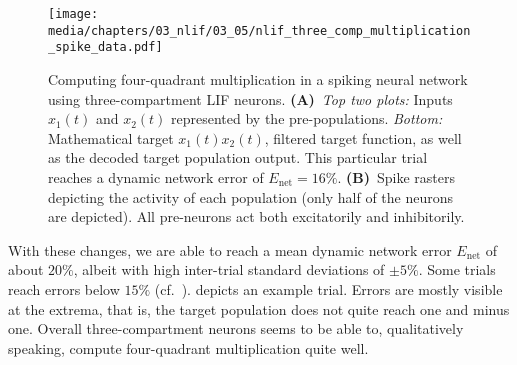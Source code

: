 \begin{figure}
	\centering
	\texttt{[image: media/chapters/03\_nlif/03\_05/nlif\_three\_comp\_multiplication\_spike\_data.pdf]}
	\caption[Computing four-quadrant multiplication in a spiking neural network using two-compartment LIF neurons]{Computing four-quadrant multiplication in a spiking neural network using three-compartment LIF neurons.
	\textbf{(A)}~\emph{Top two plots:} Inputs $x_1(t)$ and $x_2(t)$ represented by the pre-populations. \emph{Bottom:} Mathematical target $x_1(t) x_2(t)$, filtered target function, as well as the decoded target population output.
	This particular trial reaches a dynamic network error of $E_\mathrm{net} = 16\%$.
	\textbf{(B)}~Spike rasters depicting the activity of each population (only half of the neurons are depicted). All pre-neurons act both excitatorily and inhibitorily.}
	\label{fig:nlif_three_comp_multiplication_spike_data}
\end{figure}

With these changes, we are able to reach a mean dynamic network error $E_\mathrm{net}$ of about $20\%$, albeit with high inter-trial standard deviations of $\pm 5\%$.
Some trials reach errors below $15\%$ (cf.~).
 depicts an example trial.
Errors are mostly visible at the extrema, that is, the target population does not quite reach one and minus one.
Overall three-compartment neurons seems to be able to, qualitatively speaking, compute four-quadrant multiplication quite well.
